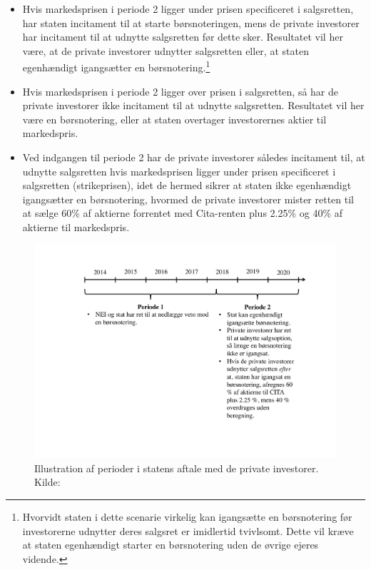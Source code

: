 \documentclass{article}
\begin{document}
\begin{itemize}
	\item Hvis markedsprisen i periode 2 ligger under prisen specificeret i salgsretten, har staten incitament til at starte børsnoteringen, mens de private investorer har incitament til at udnytte salgsretten før dette sker. Resultatet vil her være, at de private investorer udnytter salgsretten eller, at staten egenhændigt igangsætter en børsnotering.\footnote{Hvorvidt staten i dette scenarie virkelig kan igangsætte en børsnotering før investorerne udnytter deres salgsret er imidlertid tvivlsomt. Dette vil kræve at staten egenhændigt starter en børsnotering uden de øvrige ejeres vidende.}
	\item Hvis markedsprisen i periode 2 ligger over prisen i salgsretten, så har de private investorer ikke incitament til at udnytte salgsretten. Resultatet vil her være en børsnotering, eller at staten overtager investorernes aktier til markedspris.
	\item Ved indgangen til periode 2 har de private investorer således incitament til, at udnytte salgsretten hvis markedsprisen ligger under prisen specificeret i salgsretten (strikeprisen), idet de hermed sikrer at staten ikke egenhændigt igangsætter en børsnotering, hvormed de private investorer mister retten til at sælge 60\% af aktierne forrentet med Cita-renten plus 2.25\% og 40\% af aktierne til markedspris.
\end{itemize} 

\begin{figure}
\includegraphics[scale=0.6]{../figs/perioder}
\caption{Illustration af perioder i statens aftale med de private investorer. Kilde: \citet{FM2013a}}
\label{fig:perioder}
\end{figure}
\end{document}
